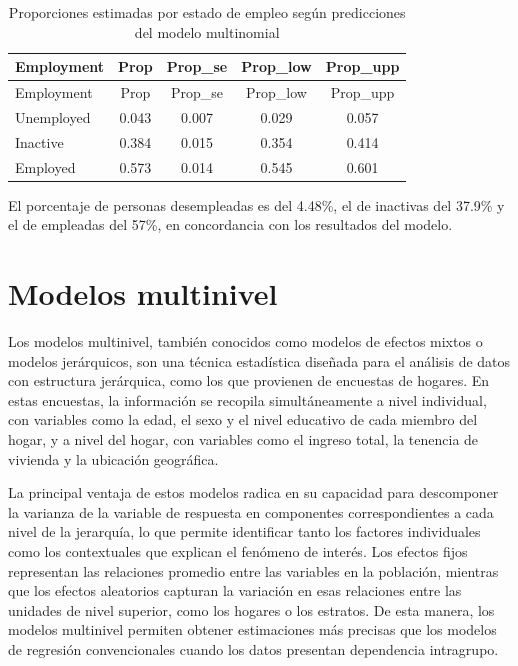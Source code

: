 \documentclass[
  spanish,
  12pt,
]{book}
\begin{document}
\begin{longtable}[]{@{}lcccc@{}}
\caption{\label{tab:tab-multinomial-comparacion}Proporciones estimadas por estado de empleo según predicciones del modelo multinomial}\tabularnewline
\toprule\noalign{}
Employment & Prop & Prop\_se & Prop\_low & Prop\_upp \\
\midrule\noalign{}
\endfirsthead
\toprule\noalign{}
Employment & Prop & Prop\_se & Prop\_low & Prop\_upp \\
\midrule\noalign{}
\endhead
\bottomrule\noalign{}
\endlastfoot
Unemployed & 0.043 & 0.007 & 0.029 & 0.057 \\
Inactive & 0.384 & 0.015 & 0.354 & 0.414 \\
Employed & 0.573 & 0.014 & 0.545 & 0.601 \\
\end{longtable}

El porcentaje de personas desempleadas es del 4.48\%, el de inactivas del 37.9\% y el de empleadas del 57\%, en concordancia con los resultados del modelo.

\chapter{Modelos multinivel}\label{cap-multinivel}

Los modelos multinivel, también conocidos como modelos de efectos mixtos o modelos jerárquicos, son una técnica estadística diseñada para el análisis de datos con estructura jerárquica, como los que provienen de encuestas de hogares. En estas encuestas, la información se recopila simultáneamente a nivel individual, con variables como la edad, el sexo y el nivel educativo de cada miembro del hogar, y a nivel del hogar, con variables como el ingreso total, la tenencia de vivienda y la ubicación geográfica.

La principal ventaja de estos modelos radica en su capacidad para descomponer la varianza de la variable de respuesta en componentes correspondientes a cada nivel de la jerarquía, lo que permite identificar tanto los factores individuales como los contextuales que explican el fenómeno de interés. Los efectos fijos representan las relaciones promedio entre las variables en la población, mientras que los efectos aleatorios capturan la variación en esas relaciones entre las unidades de nivel superior, como los hogares o los estratos. De esta manera, los modelos multinivel permiten obtener estimaciones más precisas que los modelos de regresión convencionales cuando los datos presentan dependencia intragrupo.
\end{document}
